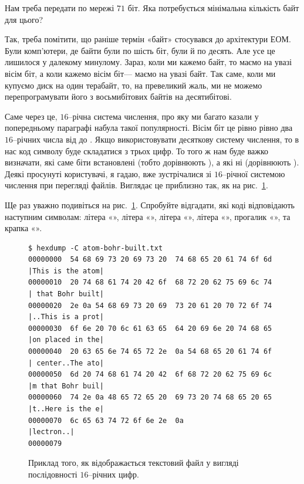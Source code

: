 \begin{exercise}
Нам треба передати по мережі $71$ біт. Яка потребується мінімальна кількість байт для цього?
\end{exercise}

Так, треба помітити, що раніше термін «байт» стосувався до архітектури ЕОМ.
Були комп'ютери, де байти були по шість біт, були й по десять.
Але усе це лишилося у далекому минулому.
Зараз, коли ми кажемо байт, то маємо на увазі вісім біт, а коли кажемо вісім біт--- маємо на увазі байт.
Так саме, коли ми купуємо диск на один терабайт, то, на превеликий жаль, ми не можемо перепрограмувати його з восьмибітових байтів на десятибітові.

Саме через це, $16$--річна система числення, про яку ми багато казали у попередньому параграфі набула такої популярності.
Вісім біт це рівно рівно два $16$--річних числа від  до .
Якщо використовувати десяткову систему числення, то в нас код символу буде складатися з трьох цифр.
То того ж нам буде важко визначати, які саме біти встановлені (тобто дорівнюють ), а які ні (дорівнюють ).
Деякі просунуті користувачі, я гадаю, вже зустрічалися зі $16$--річної системою числення при перегляді файлів.
Виглядає це приблизно так, як на рис.~\ref{PicHexDump}.

\begin{exercise}
Ще раз уважно подивіться на рис.~\ref{PicHexDump}. Спробуйте відгадати, які коді відповідають наступним символам:
літера «»,
літера «»,
літера «»,
літера «»,
прогалик «\bitstr{~}»,
та крапка «».
\end{exercise}

\begin{figure}[t]
  \centering
    \begin{Verbatim}[fontsize=\footnotesize]
$ hexdump -C atom-bohr-built.txt
00000000  54 68 69 73 20 69 73 20  74 68 65 20 61 74 6f 6d  |This is the atom|
00000010  20 74 68 61 74 20 42 6f  68 72 20 62 75 69 6c 74  | that Bohr built|
00000020  2e 0a 54 68 69 73 20 69  73 20 61 20 70 72 6f 74  |..This is a prot|
00000030  6f 6e 20 70 6c 61 63 65  64 20 69 6e 20 74 68 65  |on placed in the|
00000040  20 63 65 6e 74 65 72 2e  0a 54 68 65 20 61 74 6f  | center..The ato|
00000050  6d 20 74 68 61 74 20 42  6f 68 72 20 62 75 69 6c  |m that Bohr buil|
00000060  74 2e 0a 48 65 72 65 20  69 73 20 74 68 65 20 65  |t..Here is the e|
00000070  6c 65 63 74 72 6f 6e 2e  0a                       |lectron..|
00000079\end{Verbatim}
  \caption{Приклад того, як відображається текстовий файл у вигляді послідовності $16$--річних цифр.}
  \label{PicHexDump}
\end{figure}

